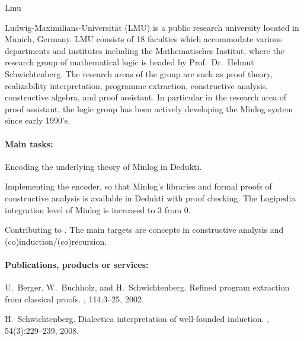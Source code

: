 \begin{sitedescription}{Lmu}

\newcommand\inquotes[1]{``#1''}


Ludwig-Maximilians-Universit\"at (LMU) is a public research university
located in Munich, Germany.  LMU consists of 18 faculties which
accommodate various departments and institutes including the
Mathematisches Institut, where the research group of mathematical
logic is headed by Prof.\ Dr.\ Helmut Schwichtenberg.  The research
areas of the group are such as proof theory, realizability
interpretation, programme extraction, constructive analysis,
constructive algebra, and proof assistant.  In particular in the
research area of proof assistant, the logic group has been actively
developing the Minlog system since early 1990's.

\paragraph*{Main tasks:}

\begin{compactitem}
  \item Encoding the underlying theory of Minlog in Dedukti.  
  \item Implementing the encoder, so that Minlog's libraries and formal proofs of constructive analysis is available in Dedukti with proof checking.
The Logipedia integration level of Minlog is increased to 3 from 0.  
  \item Contributing to .  The main targets are concepts in constructive analysis and (co)induction/(co)recursion.

\end{compactitem}

\paragraph*{Publications, products or services:}

\begin{compactitem}
\item U.~Berger, W.~Buchholz, and H.~Schwichtenberg.
\newblock Refined program extraction from classical proofs.
, 114:3--25, 2002.

\item H.~Schwichtenberg.
\newblock Dialectica interpretation of well-founded induction.
, 54(3):229--239, 2008.


\end{compactitem}
\end{sitedescription}

